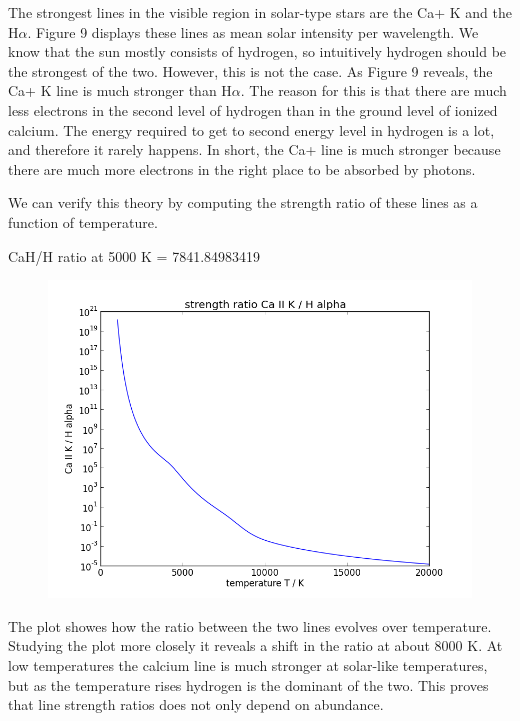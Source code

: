 \documentclass[norsk,a4paper,12pt]{article}
\begin{document}
The strongest lines in the visible region in solar-type stars are the Ca+ K and the H$\alpha$. Figure 9 displays 
these lines as mean solar intensity per wavelength. We know that the sun mostly consists of hydrogen, so intuitively
hydrogen should be the strongest of the two. However, this is not the case. As Figure 9 reveals, the Ca+ K line is 
much stronger than H$\alpha$. The reason for this is that there are much less electrons in the second level of hydrogen
than in the ground level of ionized calcium. The energy required to get to second energy level in hydrogen is a lot, 
and therefore it rarely happens. In short, the Ca+ line is much stronger because there are much more electrons in 
the right place to be absorbed by photons.

We can verify this theory by computing the strength ratio of these lines as a function of temperature. 

CaH/H ratio at 5000 K =  7841.84983419

\begin{figure}[H] 
\begin{center} 
\includegraphics[scale=0.5]{ssa28_1.png} 
 

\caption{} 
\end{center} 
\end{figure}


The plot showes how the ratio between the two lines evolves over temperature. Studying the plot more closely it reveals 
a shift in the ratio at about 8000 K. At low temperatures the calcium line is much stronger at solar-like temperatures,
but as the temperature rises hydrogen is the dominant of the two. This proves that line strength ratios does not only 
depend on abundance.
\end{document}
